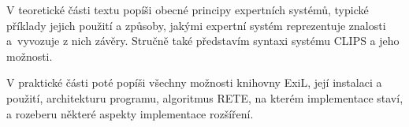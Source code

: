 V teoretické části textu popíši obecné principy expertních systémů, typické
příklady jejich použití a způsoby, jakými expertní systém reprezentuje znalosti
a~vyvozuje z nich závěry. Stručně také představím syntaxi systému CLIPS a jeho
možnosti.

V praktické části poté popíši všechny možnosti knihovny ExiL, její instalaci a
použití, architekturu programu, algoritmus RETE, na kterém implementace staví, a
rozeberu některé aspekty implementace rozšíření.
